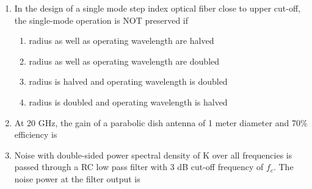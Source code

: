 \documentclass[a4paper, 11pt]{article}
\begin{document}
\begin{enumerate}
    \hfill{}
    
    \item In the design of a single mode step index optical fiber close to upper cut-off, the single-mode operation is NOT preserved if
    \begin{enumerate}
        \item radius as well as operating wavelength are halved
        \item radius as well as operating wavelength are doubled
        \item radius is halved and operating wavelength is doubled
        \item radius is doubled and operating wavelength is halved
    \end{enumerate}
    
    \hfill{}

    \item At 20 GHz, the gain of a parabolic dish antenna of 1 meter diameter and 70\% efficiency is
    \begin{enumerate}
    \end{enumerate}
    
    \hfill{}
    
    \item Noise with double-sided power spectral density of K over all frequencies is passed through a RC low pass filter with 3 dB cut-off frequency of $f_c$. The noise power at the filter output is
    \begin{enumerate}
    \end{enumerate}
    
    \hfill{}


\end{enumerate}
\end{document}
